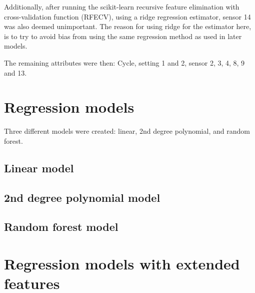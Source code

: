 \documentclass[%
oneside,    %
project,    %
nosummary   %
]{USN-MSc}
\begin{document}
Additionally, after running the scikit-learn recursive feature elimination with cross-validation function (RFECV), using a ridge regression estimator, sensor 14 was also deemed unimportant. The reason for using ridge for the estimator here, is to try to avoid bias from using the same regression method as used in later models.

The remaining attributes were then:
Cycle, setting 1 and 2, sensor 2, 3, 4, 8, 9 and 13.

\chapter{Regression models}
\label{ch:regression}
Three different models were created: linear, 2nd degree polynomial, and random forest.

\section{Linear model}
\label{sec:linMod}

\section{2nd degree polynomial model}
\label{sec:polMod}

\section{Random forest model}
\label{sec:rfMod}

\chapter{Regression models with extended features}
\label{ch:regressionExtended}
\lipsum[1]


~\nocite{*}

\cleardoublepage

\printbibliography[heading=bibintoc, title={References}]
\end{document}
